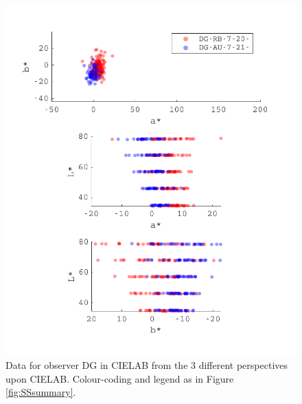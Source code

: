 \begin{figure}[htbp]
\includegraphics[max width=1.2\textwidth,center]{figs/SmallSphere/DG.pdf}
\caption{Data for observer DG in CIELAB from the 3 different perspectives upon CIELAB. Colour-coding and legend as in Figure \ref{fig:SSsummary}.}
\label{fig:SS_DG}
\end{figure}


